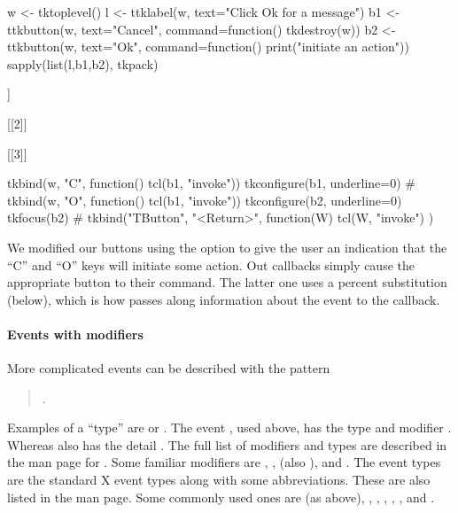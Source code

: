\begin{Schunk}
\begin{Sinput}
 w <- tktoplevel()
 l <- ttklabel(w, text="Click Ok for a message")
 b1 <- ttkbutton(w, text="Cancel", command=function() tkdestroy(w))
 b2 <- ttkbutton(w, text="Ok", command=function() print("initiate an action"))
 sapply(list(l,b1,b2), tkpack)
\end{Sinput}
\begin{Soutput}
[[1]]

[[2]]

[[3]]
\end{Soutput}
\begin{Sinput}
 tkbind(w, "C", function() tcl(b1, "invoke"))
 tkconfigure(b1, underline=0)
 #
 tkbind(w, "O", function() tcl(b1, "invoke"))
 tkconfigure(b2, underline=0)
 tkfocus(b2)
 #
 tkbind("TButton", "<Return>", function(W) {
   tcl(W, "invoke")
 })
\end{Sinput}
\end{Schunk}
%
We modified our buttons using the  option to give the
user an indication that the ``C'' and ``O'' keys will initiate some
action. Out callbacks simply cause the appropriate button to
 their command. The latter one uses a percent
substitution (below), which is how \TK\/ passes along information
about the event to the callback. 

\paragraph{Events with modifiers}
More complicated events can be described with the pattern

\begin{quotation}
.   
\end{quotation}

Examples of a ``type'' are  or
. The event , used
above, has the type  and modifier . Whereas
 also has the detail . The full
list of modifiers and types are described in the man page for
. Some familiar modifiers are , ,
 (also ),  and . The
event types are the standard X event types along with some
abbreviations. These are also listed in the  man page. Some
commonly used ones are  (as above), ,
, , ,
, and .


